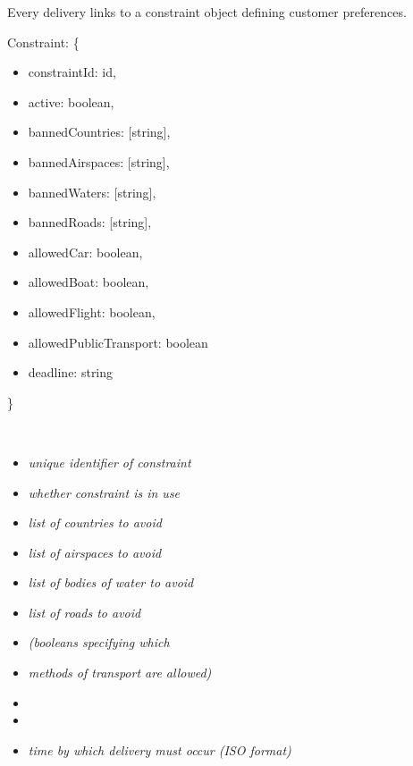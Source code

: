 Every delivery links to a constraint object defining customer preferences.

\begin{minipage}{7cm}
    Constraint: \{ 
    \begin{itemize}
        \itemsep-0.5em
        \item[] constraintId: id,
        \item[] active: boolean,
        \item[] bannedCountries: [string],
        \item[] bannedAirspaces: [string],
        \item[] bannedWaters: [string],
        \item[] bannedRoads: [string],
        \item[] allowedCar: boolean,
        \item[] allowedBoat: boolean,
        \item[] allowedFlight: boolean,
        \item[] allowedPublicTransport: boolean
        \item[] deadline: string
    \end{itemize}
    \}
\end{minipage}
\begin{minipage}{10cm}
    \hspace{1cm} \\
    \begin{itemize}
        \itemsep-0.5em
        \item[] \textit{unique identifier of constraint}
        \item[] \textit{whether constraint is in use}
        \item[] \textit{list of countries to avoid}
        \item[] \textit{list of airspaces to avoid}
        \item[] \textit{list of bodies of water to avoid}
        \item[] \textit{list of roads to avoid}
        \item[] \textit{(booleans specifying  which}
        \item[] \textit{methods of transport are allowed)}
        \item[] \hspace{1cm}
        \item[] \hspace{1cm}
        \item[] \textit{time by which delivery must occur (ISO format)}
    \end{itemize}
    \hspace{1cm} \\
\end{minipage}

